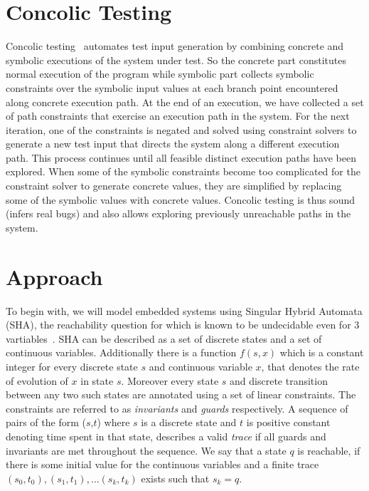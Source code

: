 
\section{Concolic Testing}
Concolic testing~\cite{SEN07} automates test input generation by combining concrete and symbolic executions of the system under test. So the concrete part constitutes normal execution of the program while symbolic part collects symbolic constraints over the symbolic input values at each branch point encountered along concrete execution path. At the end of an execution, we have collected a set of path constraints that exercise an execution path in the system. For the next iteration, one of the constraints is negated and solved using constraint solvers to generate a new test input that directs the system along a different execution path. This process continues until all feasible distinct execution paths have been explored. When some of the symbolic constraints become too complicated for the constraint solver to generate concrete values, they are simplified by replacing some of the symbolic values with concrete values.
Concolic testing is thus sound (infers real bugs) and also allows exploring previously unreachable paths in the system. 

\section{Approach}
To begin with, we will model embedded systems using Singular Hybrid Automata (SHA), the reachability question for which is known to be undecidable even for 3 vartiables~\cite{HKPV98}. SHA can be described as a set of discrete states and a set of continuous variables. Additionally there is a function $f(s,x)$ which is a constant integer for every discrete state $s$ and continuous variable $x$, that denotes the rate of evolution of $x$ in state $s$. Moreover every state $s$ and discrete transition between any two such states are annotated using a set of linear constraints. The constraints are referred to as \emph{invariants} and \emph{guards} respectively. A sequence of pairs of the form ($s$,$t$) where $s$ is a discrete state and $t$ is positive constant denoting time spent in that state, describes a valid \emph{trace} if all guards and invariants are met throughout the sequence. We say that a state $q$ is reachable, if there is some initial value for the continuous variables and a finite trace $(s_0, t_0), (s_1, t_1),\ldots (s_k,t_k)$ exists such that $s_k = q$. 

